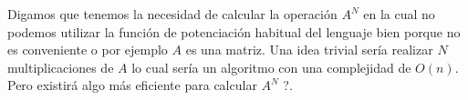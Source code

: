 Digamos que tenemos la necesidad de calcular la operación $A^N$ en la cual no podemos utilizar la función de potenciación habitual del lenguaje bien porque no es conveniente o por ejemplo $A$ es una matriz. Una idea trivial sería realizar $N$ multiplicaciones de $A$ lo cual sería un algoritmo con una complejidad de $O(n)$. Pero existirá algo más eficiente para calcular $A^N$ ?.